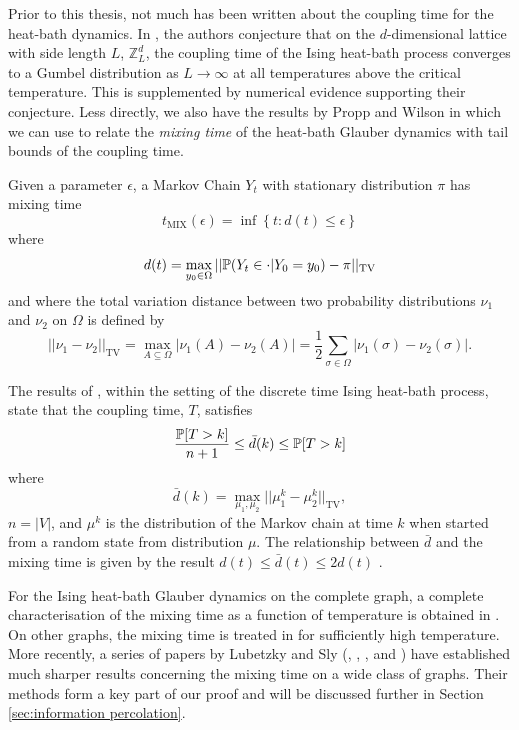 	Prior to this thesis, not much has been written about the coupling time for the heat-bath dynamics. In \cite[Conjecture 7.1]{Collevecchio2018-nq}, the authors conjecture that on the $d$-dimensional lattice with side length $L$, $\mathbb{Z}^d_L$, the coupling time of the Ising heat-bath process converges to a Gumbel distribution as $L \rightarrow \infty$ at all temperatures above the critical temperature. This is supplemented by numerical evidence supporting their conjecture. Less directly, we also have the results by Propp and Wilson in \cite[Section 5]{Propp1996-cf} which we can use to relate the \emph{mixing time} of the heat-bath Glauber dynamics with tail bounds of the coupling time. 

	Given a parameter $\epsilon$, a Markov Chain $Y_t$ with stationary distribution $\pi$ has mixing time
	\begin{equation}
	\label{eq:mixing time definition}
		t_\mathrm{MIX}(\epsilon) = \inf\left\{t: d(t) \leq \epsilon \right\}
	\end{equation}
	where
	\begin{equation}
		d(t) = \max_{y_0 \in \Omega} ||\mathbb{P}(Y_t \in \cdot | Y_0 = y_0) - \pi ||_\mathrm{TV}
	\end{equation}
	and where the total variation distance between two probability distributions $\nu_1$ and $\nu_2$ on $\Omega$ is defined by 
	\begin{equation}
		||\nu_1 - \nu_2||_\mathrm{TV} = \max_{A \subseteq \Omega}|\nu_1(A) - \nu_2(A)| = \frac{1}{2}\sum_{\sigma \in \Omega} |\nu_1(\sigma) - \nu_2(\sigma)|.
	\end{equation}

	The results of \cite[Theorem 5]{Propp1996-cf}, within the setting of the discrete time Ising heat-bath process, state that the coupling time, $T$, satisfies
	\begin{equation}
		\frac{\mathbb{P}[T > k]}{n+1} \leq \bar{d}(k) \leq \mathbb{P}[T > k]
	\end{equation}
	where
	\begin{equation}
		\bar{d}(k) = \max_{\mu_1, \mu_2} || \mu_1^k - \mu_2^k||_\mathrm{TV},
	\end{equation}
	$n = |V|$, and $\mu^k$ is the distribution of the Markov chain at time $k$ when started from a random state from distribution $\mu$. The relationship between $\bar{d}$ and the mixing time is given by the result $d(t) \leq \bar{d}(t) \leq 2d(t)$ \cite[Lemma 4.10]{Levin2009-fo}.
	
	For the Ising heat-bath Glauber dynamics on the complete graph, a complete characterisation of the mixing time as a function of temperature is obtained in \cite{Ding2009-du}. On other graphs, the mixing time is treated in \cite{Martinelli1994-bv} for sufficiently high temperature. More recently, a series of papers by Lubetzky and Sly (\cite{Lubetzky2013-yv}, \cite{Lubetzky2015-po}, \cite{Lubetzky2016-wd}, and \cite{Lubetzky2017-nc}) have established much sharper results concerning the mixing time on a wide class of graphs. Their methods form a key part of our proof and will be discussed further in Section \ref{sec:information percolation}.

